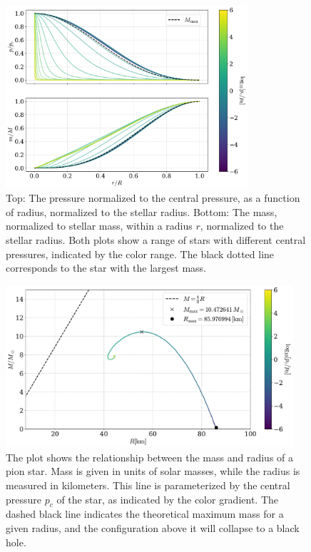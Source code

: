 \begin{figure}[!htb]
    \centering
    \includegraphics[width=0.8\textwidth]{../scripts/figurer/pressure_mass_pion_star.pdf}
    \caption{
        Top: The pressure normalized to the central pressure, as a function of radius, normalized to the stellar radius.
    Bottom: The mass, normalized to stellar mass, within a radius $r$, normalized to the stellar radius.
    Both plots show a range of stars with different central pressures, indicated by the color range.
    The black dotted line corresponds to the star with the largest mass.}
    \label{fig: pressure and mass for tree-level pion star}
\end{figure}


\begin{figure}[!htb]
    \centering
    \includegraphics[width=0.95\textwidth]{../scripts/figurer/mass_radius_pion_star_tree.pdf}
    \caption{
        The plot shows the relationship between the mass and radius of a pion star. Mass is given in units of solar masses, while the radius is measured in kilometers.
        This line is parameterized by the central pressure $p_c$ of the star, as indicated by the color gradient.
        The dashed black line indicates the theoretical maximum mass for a given radius, and the configuration above it will collapse to a black hole.
        }
        \label{fig: mass radius relation tree-level pion star}
\end{figure}


